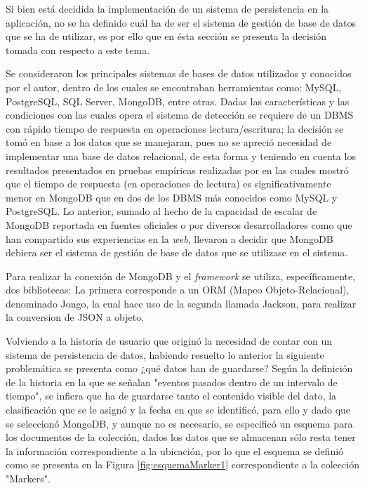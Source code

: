 Si bien está decidida la implementación de un sistema de persistencia en la aplicación, no se ha definido cuál ha de ser el sistema de gestión de base de datos que se ha de utilizar, es por ello que en ésta sección se presenta la decisión tomada con respecto a este tema.

Se consideraron los principales sistemas de bases de datos utilizados y conocidos por el autor, dentro de los cuales se encontraban herramientas como: MySQL, PostgreSQL, SQL Server, MongoDB, entre otras. Dadas las características y las condiciones con las cuales opera el sistema de detección se requiere de un DBMS con rápido tiempo de respuesta en operaciones lectura/escritura; la decisión se tomó en base a los datos que se manejaran, pues no se apreció necesidad de implementar una base de datos relacional, de esta forma y teniendo en cuenta los resultados presentados en pruebas empíricas realizadas por \cite{MongoPerformance} en las cuales mostró que el tiempo de respuesta (en operaciones de lectura) es significativamente menor en MongoDB que en dos de los DBMS más conocidos como MySQL y PostgreSQL. Lo anterior, sumado al hecho de la capacidad de escalar de MongoDB reportada en fuentes oficiales o por diversos desarrolladores como \cite{MongoDBScalability} que han compartido sus experiencias en la \textit{web}, llevaron a decidir que MongoDB debiera ser el sistema de gestión de base de datos que se utilizase en el sistema.

Para realizar la conexión de MongoDB y el \textit{framework} se utiliza, específicamente, dos bibliotecas: La primera corresponde a un ORM (Mapeo Objeto-Relacional), denominado Jongo, la cual hace uso de la segunda llamada Jackson, para realizar la conversion de JSON a objeto.

Volviendo a la historia de usuario que originó la necesidad de contar con un sistema de persistencia de datos, habiendo resuelto lo anterior la siguiente problemática se presenta como ¿qué datos han de guardarse? Según la definición de la historia en la que se señalan "eventos pasados dentro de un intervalo de tiempo", se infiera que ha de guardarse tanto el contenido visible del dato, la clasificación que se le asignó y la fecha en que se identificó, para ello y dado que se seleccionó MongoDB, y aunque no es necesario, se especificó un esquema para los documentos de la colección, dados los datos que se almacenan sólo resta tener la información correspondiente a la ubicación, por lo que el esquema se definió como se presenta en la Figura \ref{fig:esquemaMarker1} correspondiente a la colección "Markers".


